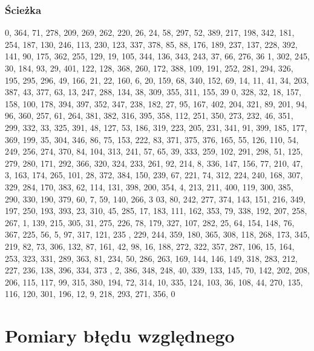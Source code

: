 \documentclass{article}
\begin{document}
\subsubsection{Ścieżka}
0, 364, 71, 278, 209, 269, 262, 220, 26, 24, 58, 297, 52, 389, 217, 198, 342, 181, 254, 187, 130, 246, 113, 230, 123, 337, 378, 85, 88, 176, 189, 237, 137, 228, 392, 141, 90, 175, 362, 255, 129, 19, 105, 344, 136, 343, 243, 37, 66, 276, 36
1, 302, 245, 30, 184, 93, 29, 401, 122, 128, 368, 260, 172, 388, 109, 191, 252, 281, 294, 326, 195, 295, 296, 49, 166, 21, 22, 160, 6, 20, 159, 68, 340, 152, 69, 14, 11, 41, 34, 203, 387, 43, 377, 63, 13, 247, 288, 134, 38, 309, 355, 311, 155, 39
0, 328, 32, 18, 157, 158, 100, 178, 394, 397, 352, 347, 238, 182, 27, 95, 167, 402, 204, 321, 89, 201, 94, 96, 360, 257, 61, 264, 381, 382, 316, 395, 358, 112, 251, 350, 273, 232, 46, 351, 299, 332, 33, 325, 391, 48, 127, 53, 186, 319, 223, 205,
231, 341, 91, 399, 185, 177, 369, 199, 35, 304, 346, 86, 75, 153, 222, 83, 371, 375, 376, 165, 55, 126, 110, 54, 249, 256, 274, 370, 84, 104, 313, 241, 57, 65, 39, 333, 259, 102, 291, 298, 51, 125, 279, 280, 171, 292, 366, 320, 324, 233, 261, 92,
 214, 8, 336, 147, 156, 77, 210, 47, 3, 163, 174, 265, 101, 28, 372, 384, 150, 239, 67, 221, 74, 312, 224, 240, 168, 307, 329, 284, 170, 383, 62, 114, 131, 398, 200, 354, 4, 213, 211, 400, 119, 300, 385, 290, 330, 190, 379, 60, 7, 59, 140, 266, 3
03, 80, 242, 277, 374, 143, 151, 216, 349, 197, 250, 193, 393, 23, 310, 45, 285, 17, 183, 111, 162, 353, 79, 338, 192, 207, 258, 267, 1, 139, 215, 305, 31, 275, 226, 78, 179, 327, 107, 282, 25, 64, 154, 148, 76, 367, 225, 56, 5, 97, 317, 121, 235
, 229, 244, 359, 180, 365, 308, 118, 268, 173, 345, 219, 82, 73, 306, 132, 87, 161, 42, 98, 16, 188, 272, 322, 357, 287, 106, 15, 164, 253, 323, 331, 289, 363, 81, 234, 50, 286, 263, 169, 144, 146, 149, 318, 283, 212, 227, 236, 138, 396, 334, 373
, 2, 386, 348, 248, 40, 339, 133, 145, 70, 142, 202, 208, 206, 115, 117, 99, 315, 380, 194, 72, 314, 10, 335, 124, 103, 36, 108, 44, 270, 135, 116, 120, 301, 196, 12, 9, 218, 293, 271, 356, 0

\section{Pomiary błędu względnego}
\end{document}
